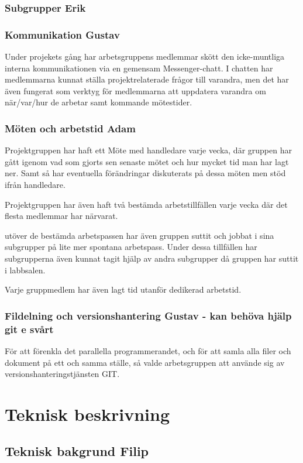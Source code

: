 \documentclass{article}
\begin{document}
\subsubsection{Subgrupper Erik}
\subsubsection{Kommunikation Gustav}
Under projekets gång har arbetsgruppens medlemmar skött den icke-muntliga 
interna kommunikationen via en gemensam Messenger-chatt. 
I chatten har medlemmarna kunnat ställa projektrelaterade 
frågor till varandra, men det har även fungerat som verktyg
 för medlemmarna att uppdatera varandra om när/var/hur de 
 arbetar samt kommande mötestider.
\subsubsection{Möten och arbetstid Adam}
Projektgruppen har haft ett Möte med handledare varje vecka, där
gruppen har gått igenom vad som gjorts sen senaste mötet och hur
mycket tid man har lagt ner. Samt så har eventuella förändringar
diskuterats på dessa möten men stöd ifrån handledare.

Projektgruppen har även haft två bestämda arbetstillfällen varje
vecka där det flesta medlemmar har närvarat. 

utöver de bestämda arbetspassen har även gruppen suttit och 
jobbat i sina subgrupper på lite mer spontana arbetspass. Under
dessa tillfällen har subgrupperna även kunnat tagit hjälp av 
andra subgrupper då gruppen har suttit i labbsalen.

Varje gruppmedlem har även lagt tid utanför dedikerad arbetstid.  

\subsubsection{Fildelning och versionshantering Gustav - kan behöva hjälp git e svårt}
För att förenkla det parallella programmerandet, och för att samla alla filer och dokument 
på ett och samma ställe, så valde arbetsgruppen att använde sig av versionshanteringstjänsten GIT.


\section{Teknisk beskrivning} %
\subsection{Teknisk bakgrund Filip}
\end{document}
